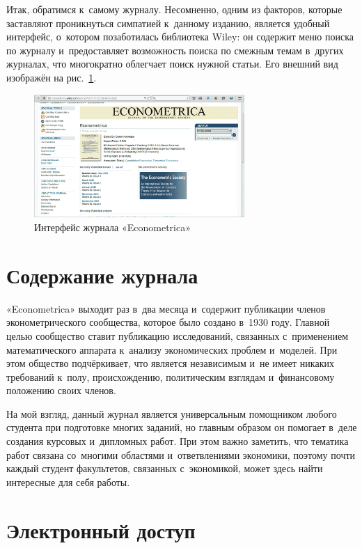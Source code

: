 \documentclass[11pt]{article}
\begin{document}
Итак, обратимся к~самому журналу. Несомненно, одним из факторов, которые заставляют проникнуться симпатией к~данному изданию, является удобный интерфейс, о~котором позаботилась библиотека Wiley: он содержит меню поиска по журналу и~предоставляет возможность поиска по смежным темам в~других журналах, что многократно облегчает поиск нужной статьи. Его внешний вид изображён на рис.~\ref{fig:econometrica}.


\begin{figure}[htbp]
\centering  \includegraphics[width=8cm]{wiley.png}
\caption{Интерфейс журнала «Econometrica»} \label{fig:econometrica}
\end{figure}




\section{Содержание журнала}

«Econometrica» выходит раз в~два месяца и~содержит публикации членов эконометрического сообщества, которое было создано в~1930 году. Главной целью сообщество ставит публикацию исследований, связанных с~применением математического аппарата к~анализу экономических проблем и~моделей. При этом общество подчёркивает, что является независимым и~не имеет никаких требований к~полу, происхождению, политическим взглядам и~финансовому положению своих членов.

На мой взгляд, данный журнал является универсальным помощником любого студента при подготовке многих заданий, но главным образом он помогает в~деле создания курсовых и~дипломных работ. При этом важно заметить, что тематика работ связана со~многими областями и~ответвлениями экономики, поэтому почти каждый студент факультетов, связанных с~экономикой, может здесь найти интересные для себя работы.

\section{Электронный доступ}
\end{document}
